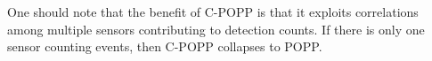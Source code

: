 One should note that the benefit of C-POPP is that it exploits correlations among multiple sensors contributing to detection counts. If there is only one sensor counting events, then C-POPP collapses to POPP.


%
%
%
%
%
%
%
